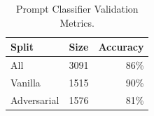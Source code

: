 \begin{table}
    \centering
    \small
    
    \caption{Prompt Classifier Validation Metrics.}
    
    \begin{tabular}{ l l r }
         \toprule
         \textbf{Split} & \textbf{Size} & \textbf{Accuracy} \\
         \midrule
         All &  3091 & 86\% \\
         \midrule
         Vanilla & 1515 & 90\% \\
         \midrule
         Adversarial & 1576 & 81\% \\
         \bottomrule
    \end{tabular}
    \label{tab:appendix_prompt_cls_val_accuracy}
\end{table}
